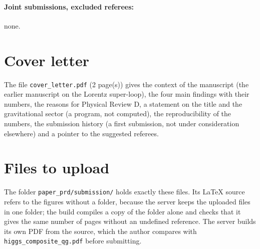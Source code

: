 \documentclass[11pt]{article}
\begin{document}
\paragraph{Joint submissions, excluded referees:} none.

\section{Cover letter}

The file \texttt{cover\_letter.pdf} (2 page(s)) gives the context of the manuscript (the earlier manuscript
on the Lorentz super-loop), the four main findings with their numbers, the reasons for Physical Review D, a statement on
the title and the gravitational sector (a program, not computed), the reproducibility of the numbers, the submission
history (a first submission, not under consideration elsewhere) and a pointer to the suggested referees.

\section{Files to upload}
\label{sec:files}

The folder \texttt{paper\_prd/submission/} holds exactly these files. Its LaTeX source refers to the figures without a
folder, because the server keeps the uploaded files in one folder; the build compiles a copy of the folder alone and checks
that it gives the same number of pages without an undefined reference. The server builds its own PDF from the source,
which the author compares with \texttt{higgs\_composite\_qg.pdf} before submitting.
\end{document}
